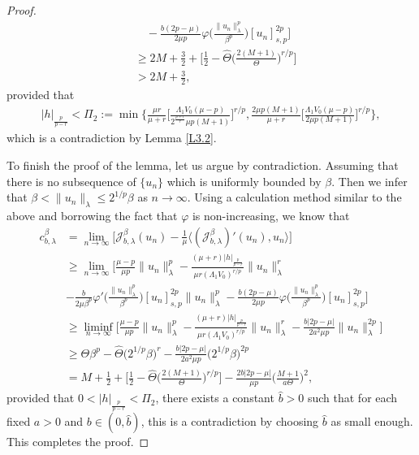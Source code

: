 \documentclass[reqno]{amsart}
\begin{document}
\begin{proof}
\begin{align*}
&\quad -\frac{b(2p-\mu)}{2\mu p}\varphi\Big( \frac{\|u_n\|^p_\lambda}{\beta^p}\Big)
  [u_n]^{2p}_{s,p}\Big]  \\
&\geq 2M+\frac{3}{2}+\Big[\frac{1}{2}-\widehat{\Theta} 
 \Big(\frac{2(M+1)}{\Theta}\Big)^{r/p} \Big]  \\
&> 2M+\frac{3}{2},
\end{align*}
provided that
\begin{align*}
|h|_{\frac{p}{p-r}}
<\Pi_2:=\min\Big\{\frac{\mu r}{\mu+r} \Big[\frac{\Lambda_1 V_0(\mu-p)}{2^{\frac{p+r}{r}}
 \mu p(M+1)}\Big]^{r/p},
\frac{2\mu p(M+1)}{\mu+r}\Big[\frac{\Lambda_1 V_0(\mu-p)}{2\mu p(M+1)}
 \Big]^{r/p}\Big\},
\end{align*}
which is a contradiction by Lemma \ref{L3.2}.

To finish the proof of the lemma, let us argue by contradiction. 
Assuming that there is no subsequence of $\{u_n\}$ which is uniformly bounded by 
$\beta$. Then we infer that $\beta<\|u_n\|_\lambda \leq 2^{1/p}\beta$ as
$n\to  \infty$. Using a calculation method similar to the above and borrowing the 
fact that $\varphi$ is non-increasing, we know that
\begin{align*}
 c_{b,\lambda}^\beta
&= \lim_{n\to \infty} \Big[\mathcal{J}^\beta_{b,\lambda}(u_n)-\frac{1}{\mu} \langle (\mathcal{J}^\beta_{b,\lambda})'(u_n), u_n\rangle \Big]    \\
&\geq \lim_{n\to \infty} \Big[\frac{\mu-p}{\mu p}\|u_n\|^p_\lambda-\frac{(\mu+r)|h|_{\frac{p}{p-r}}}{\mu r (\Lambda_1 V_0)^{r/p}}\|u_n\|^r_\lambda   \\
&-\frac{b}{2\mu\beta^p} \varphi'\Big( \frac{\|u_n\|^p_\lambda}{\beta^p}\Big) [u_n]^{2p}_{s,p}\|u_n\|^p_\lambda
-\frac{b(2p-\mu)}{2\mu p}\varphi\Big( \frac{\|u_n\|^p_\lambda}{\beta^p}\Big) [u_n]^{2p}_{s,p}\Big]  \\
&\geq \liminf_{n\to \infty} \Big[\frac{\mu-p}{\mu p}\|u_n\|^p_\lambda-\frac{(\mu+r)|h|_{\frac{p}{p-r}}}{\mu r (\Lambda_1 V_0)^{r/p}}\|u_n\|^r_\lambda-\frac{b|2p-\mu|}{2a^2\mu p} \|u_n\|^{2p}_\lambda\Big]  \\
&\geq \Theta\beta^p-\widehat{\Theta}\Big(2^{1/p}\beta\Big)^r-\frac{b|2p-\mu|}{2a^2\mu p}\Big(2^{1/p}\beta\Big)^{2p}   \\
&= M+\frac{1}{2}+\Big[\frac{1}{2}-\widehat{\Theta} \Big(\frac{2(M+1)}{\Theta}\Big)^{r/p}\Big]-\frac{2b|2p-\mu|}{\mu p} \Big(\frac{M+1}{a\Theta}\Big)^2,
\end{align*}
provided that $0<|h|_{\frac{p}{p-r}}<\Pi_2$, there exists a constant $\widehat{b}>0$ 
such that for each fixed $a>0$ and $b\in(0, \widehat{b})$, this is a contradiction 
by choosing $\widehat{b}$ as small enough. This completes the proof.
\end{proof}
\end{document}
